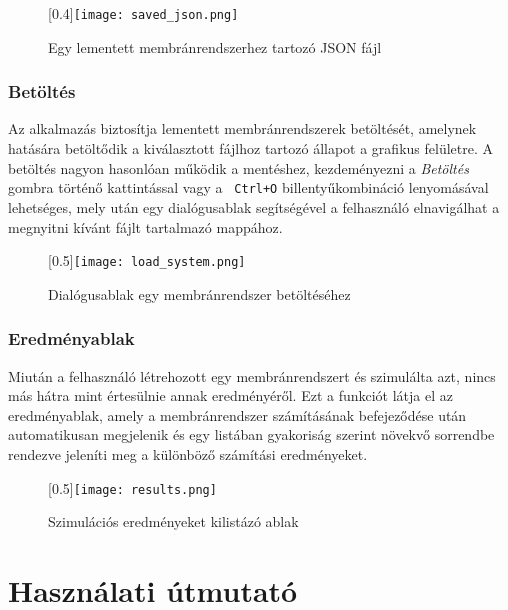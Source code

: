 \begin{figure}[H]
	\centering
	\scalebox{0.4}[0.4]{\texttt{[image: saved\_json.png]}}
	\caption{Egy lementett membránrendszerhez tartozó JSON fájl  \protect\footnotemark}
	\label{fig:saved_json}
\end{figure}


\subsubsection{Betöltés}

Az alkalmazás biztosítja lementett membránrendszerek betöltését, amelynek hatására betöltődik a kiválasztott fájlhoz tartozó állapot a grafikus felületre.
A betöltés nagyon hasonlóan működik a mentéshez, kezdeményezni a \textit{Betöltés} gombra történő kattintással vagy a \verb| Ctrl+O| billentyűkombináció lenyomásával lehetséges, mely után egy dialógusablak segítségével a felhasználó elnavigálhat a megnyitni kívánt fájlt tartalmazó mappához.

\begin{figure}[H]
	\centering
	\scalebox{0.5}[0.5]{\texttt{[image: load\_system.png]}}
	\caption{Dialógusablak egy membránrendszer betöltéséhez}
	\label{fig:load_system}
\end{figure}

\subsubsection{Eredményablak}

Miután a felhasználó létrehozott egy membránrendszert és szimulálta azt, nincs más hátra mint értesülnie annak eredményéről.  Ezt a funkciót látja el az eredményablak, amely a membránrendszer számításának befejeződése után automatikusan megjelenik és egy listában gyakoriság szerint növekvő sorrendbe rendezve jeleníti meg a különböző számítási eredményeket.

\begin{figure}[H]
	\centering
	\scalebox{0.5}[0.5]{\texttt{[image: results.png]}}
	\caption{Szimulációs eredményeket kilistázó ablak}
	\label{fig:load_system}
\end{figure}

\section{Használati útmutató}\label{help}

